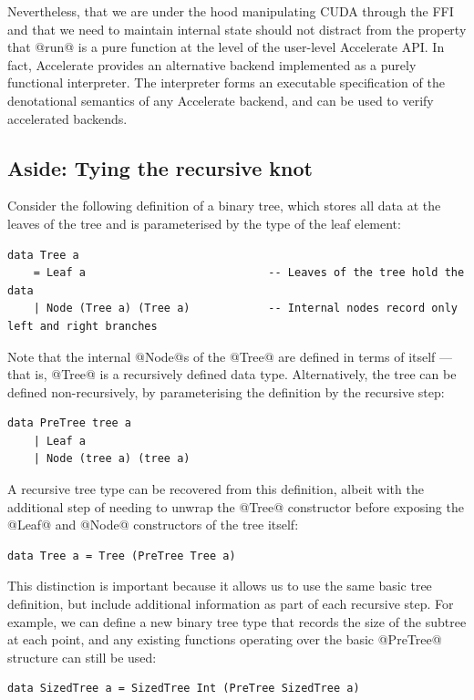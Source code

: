 Nevertheless, that we are under the hood manipulating CUDA through the FFI and
that we need to maintain internal state should not distract from the property
that @run@ is a pure function at the level of the user-level Accelerate
API. In fact, Accelerate provides an alternative backend implemented as a purely
functional interpreter. The interpreter forms an executable specification of the
denotational semantics of any Accelerate backend, and can be used to verify
accelerated backends.


\subsection{Aside: Tying the recursive knot}
\label{sec:knot_tying}

Consider the following definition of a binary tree, which stores all data at the
leaves of the tree and is parameterised by the type of the leaf element:
%
\begin{lstlisting}[style=haskell]
data Tree a
    = Leaf a                            -- Leaves of the tree hold the data
    | Node (Tree a) (Tree a)            -- Internal nodes record only left and right branches
\end{lstlisting}
%
Note that the internal @Node@s of the @Tree@ are defined in terms of
itself --- that is, @Tree@ is a recursively defined data type.
Alternatively, the tree can be defined non-recursively, by parameterising the
definition by the recursive step:
%
\begin{lstlisting}[style=haskell]
data PreTree tree a
    | Leaf a
    | Node (tree a) (tree a)
\end{lstlisting}
%
A recursive tree type can be recovered from this definition, albeit with the
additional step of needing to unwrap the @Tree@ constructor before exposing
the @Leaf@ and @Node@ constructors of the tree itself:
%
\begin{lstlisting}[style=haskell,firstnumber=4]
data Tree a = Tree (PreTree Tree a)
\end{lstlisting}

This distinction is important because it allows us to use the same basic tree
definition, but include additional information as part of each recursive step.
For example, we can define a new binary tree type that records the size of the
subtree at each point, and any existing functions operating over the basic
@PreTree@ structure can still be used:
%
\begin{lstlisting}[style=haskell,firstnumber=5]
data SizedTree a = SizedTree Int (PreTree SizedTree a)
\end{lstlisting}


